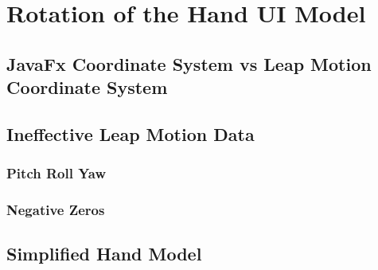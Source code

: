 \chapter{Rotation of the Hand UI Model}

\label{Chapter4_rotation} 

\begin{comment}
-------------------------------------------------
4. Rotation of Hand UI Model
	a. JavaFx Coordinate System vs Leap Motion Coordinate System
	b. Ineffective Leap Motion Data
		i. Pitch Roll Yaw
		ii. Negative Zeros
	c. Simplified Hand Model
	d. Composite Linear Transformations
	e. Rotational Matrix
-------------------------------------------------
\end{comment}




\section{JavaFx Coordinate System vs Leap Motion Coordinate System}
	


\section{Ineffective Leap Motion Data}


\subsection{Pitch Roll Yaw}


\subsection{Negative Zeros}





\section{Simplified Hand Model}
	
